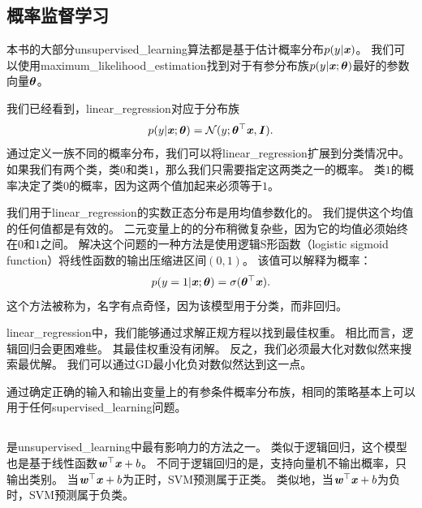 
\subsection{概率监督学习}
\label{sec:probabilistic_supervised_learning}
本书的大部分\gls{unsupervised_learning}算法都是基于估计概率分布$p(y|\boldsymbol{\mathit{x}})$。
我们可以使用\gls{maximum_likelihood_estimation}找到对于有参分布族$p(y|\boldsymbol{\mathit{x}};\boldsymbol{\theta})$最好的参数向量$\boldsymbol{\theta}$。 

我们已经看到，\gls{linear_regression}对应于分布族
\begin{equation}
    p(y | \boldsymbol{\mathit{x}}; \boldsymbol{\theta}) = \mathcal{N}( y; \boldsymbol{\theta}^\top \boldsymbol{\mathit{x}}, \boldsymbol{\mathit{I}}).
\end{equation}
通过定义一族不同的概率分布，我们可以将\gls{linear_regression}扩展到分类情况中。
如果我们有两个类，类$0$和类$1$，那么我们只需要指定这两类之一的概率。
类$1$的概率决定了类$0$的概率，因为这两个值加起来必须等于$1$。

我们用于\gls{linear_regression}的实数正态分布是用均值参数化的。
我们提供这个均值的任何值都是有效的。
二元变量上的的分布稍微复杂些，因为它的均值必须始终在$0$和$1$之间。
解决这个问题的一种方法是使用逻辑S形函数（logistic sigmoid function）将线性函数的输出压缩进区间$(0,1)$。
该值可以解释为概率：
\begin{equation}
    p(y = 1 | \boldsymbol{\mathit{x}}; \boldsymbol{\theta}) = \sigma(\boldsymbol{\theta}^\top \boldsymbol{\mathit{x}}).
\end{equation}
这个方法被称为，名字有点奇怪，因为该模型用于分类，而非回归。

\gls{linear_regression}中，我们能够通过求解正规方程以找到最佳权重。
相比而言，逻辑回归会更困难些。
其最佳权重没有闭解。
反之，我们必须最大化对数似然来搜索最优解。
我们可以通过\gls{GD}最小化负对数似然达到这一点。

通过确定正确的输入和输出变量上的有参条件概率分布族，相同的策略基本上可以用于任何\gls{supervised_learning}问题。

\subsection{}
\label{sec:support_vector_machines}
是\gls{unsupervised_learning}中最有影响力的方法之一\citep{Boser92,Cortes95}。
类似于逻辑回归，这个模型也是基于线性函数$\boldsymbol{\mathit{w}}^\top \boldsymbol{\mathit{x}} + b$。
不同于逻辑回归的是，支持向量机不输出概率，只输出类别。
当$\boldsymbol{\mathit{w}}^\top\boldsymbol{\mathit{x}} + b$为正时，\gls{SVM}预测属于正类。
类似地，当$\boldsymbol{\mathit{w}}^\top\boldsymbol{\mathit{x}} + b$为负时，\gls{SVM}预测属于负类。



